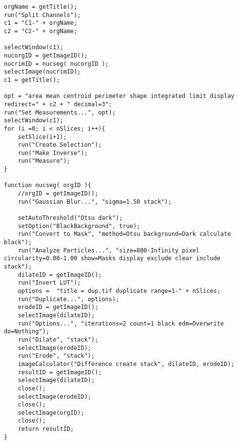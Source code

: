\begin{lstlisting}[morekeywords={*, function, return, orgID, resultID, nucseg}]
orgName = getTitle();
run("Split Channels");
c1 = "C1-" + orgName;
c2 = "C2-" + orgName;

selectWindow(c1);
nucorgID = getImageID();
nucrimID = nucseg( nucorgID );
selectImage(nucrimID);
c1 = getTitle();

opt = "area mean centroid perimeter shape integrated limit display redirect=" + c2 + " decimal=3";
run("Set Measurements...", opt);
selectWindow(c1);
for (i =0; i < nSlices; i++){
	setSlice(i+1);
	run("Create Selection");
	run("Make Inverse");
	run("Measure");
}

function nucseg( orgID ){
	//orgID = getImageID();
	run("Gaussian Blur...", "sigma=1.50 stack");
	
	setAutoThreshold("Otsu dark");
	setOption("BlackBackground", true);
	run("Convert to Mask", "method=Otsu background=Dark calculate black");
	run("Analyze Particles...", "size=800-Infinity pixel circularity=0.00-1.00 show=Masks display exclude clear include stack");
	dilateID = getImageID();
	run("Invert LUT");
	options =  "title = dup.tif duplicate range=1-" + nSlices;
	run("Duplicate...", options);
	erodeID = getImageID();
	selectImage(dilateID);
	run("Options...", "iterations=2 count=1 black edm=Overwrite do=Nothing");
	run("Dilate", "stack");
	selectImage(erodeID);
	run("Erode", "stack");
	imageCalculator("Difference create stack", dilateID, erodeID);
	resultID = getImageID();
	selectImage(dilateID);
	close();
	selectImage(erodeID);
	close();
	selectImage(orgID);
	close();
	return resultID;
}



\end{lstlisting}
